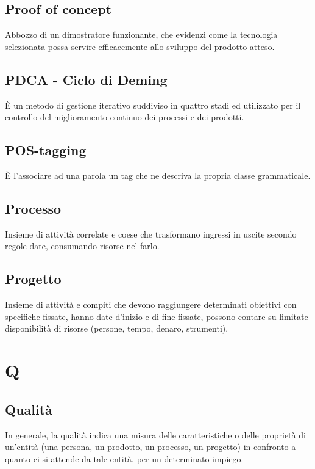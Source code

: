 {	\subsection{Proof of concept}
	Abbozzo di un dimostratore funzionante, che evidenzi come la tecnologia selezionata possa servire efficacemente allo sviluppo del prodotto atteso.
	
	\subsection{PDCA - Ciclo di Deming}
	\`E un metodo di gestione iterativo suddiviso in quattro stadi ed utilizzato per il controllo del miglioramento continuo dei processi e dei prodotti.
	
	\subsection{POS-tagging}
	\`E l'associare ad una parola un tag che ne descriva la propria classe grammaticale.
	
	\subsection{Processo} 
	Insieme di attività correlate e coese che trasformano ingressi in uscite secondo regole date, consumando risorse nel farlo.
	
	\subsection{Progetto} 
	Insieme di attività e compiti che devono raggiungere determinati obiettivi con specifiche fissate, hanno date d'inizio e di fine fissate, possono contare su limitate disponibilità di risorse (persone, tempo, denaro, strumenti).
	
	\section{Q}
	\subsection{Qualità} 
	In generale, la qualità indica una misura delle caratteristiche o delle proprietà di un'entità (una persona, un prodotto, un processo, un progetto) in confronto a quanto ci si attende da tale entità, per un determinato impiego.
	
}
